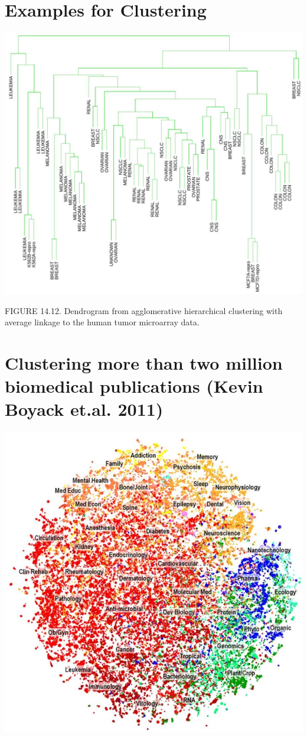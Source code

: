 \documentclass[10pt]{article}
\begin{document}
\section*{Examples for Clustering}
\begin{center}
\includegraphics[max width=\textwidth]{2024_01_08_e090cb7d953bac87fc33g-06}
\end{center}

FIGURE 14.12. Dendrogram from agglomerative hierarchical clustering with average linkage to the human tumor microarray data.

\section*{Clustering more than two million biomedical publications (Kevin Boyack et.al. 2011)}
\begin{center}
\includegraphics[max width=\textwidth]{2024_01_08_e090cb7d953bac87fc33g-07(1)}
\end{center}
\end{document}
